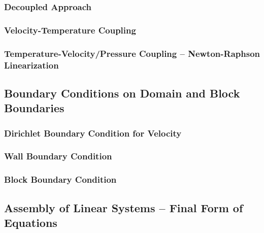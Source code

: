 \subsubsection{Decoupled Approach}
\subsubsection{Velocity-Temperature Coupling}
\subsubsection{Temperature-Velocity/Pressure Coupling -- Newton-Raphson Linearization}

\subsection{Boundary Conditions on Domain and Block Boundaries}

\subsubsection{Dirichlet Boundary Condition for Velocity}


\subsubsection{Wall Boundary Condition}

\subsubsection{Block Boundary Condition}

\subsection{Assembly of Linear Systems -- Final Form of Equations}

